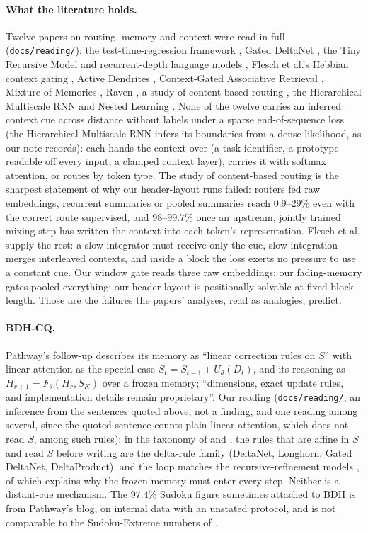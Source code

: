 \documentclass[11pt]{article}
\begin{document}
\paragraph{What the literature holds.} Twelve papers on routing, memory and context were read in full (\texttt{docs/reading/}): the test-time-regression framework \cite{ttr}, Gated DeltaNet \cite{gdn}, the Tiny Recursive Model and recurrent-depth language models \cite{trm, recdepth}, Flesch et al.'s Hebbian context gating \cite{flesch}, Active Dendrites \cite{dendrites}, Context-Gated Associative Retrieval \cite{cgar}, Mixture-of-Memories \cite{mom}, Raven \cite{raven}, a study of content-based routing \cite{routing}, the Hierarchical Multiscale RNN \cite{hmrnn} and Nested Learning \cite{nested}. None of the twelve carries an inferred context cue across distance without labels under a sparse end-of-sequence loss (the Hierarchical Multiscale RNN infers its boundaries from a dense likelihood, as our note records): each hands the context over (a task identifier, a prototype readable off every input, a clamped context layer), carries it with softmax attention, or routes by token type. The study of content-based routing is the sharpest statement of why our header-layout runs failed: routers fed raw embeddings, recurrent summaries or pooled summaries reach $0.9$--$29\%$ even with the correct route supervised, and $98$--$99.7\%$ once an upstream, jointly trained mixing step has written the context into each token's representation. Flesch et al. supply the rest: a slow integrator must receive only the cue, slow integration merges interleaved contexts, and inside a block the loss exerts no pressure to use a constant cue. Our window gate reads three raw embeddings; our fading-memory gates pooled everything; our header layout is positionally solvable at fixed block length. Those are the failures the papers' analyses, read as analogies, predict.

\paragraph{BDH-CQ.} Pathway's follow-up \cite{bdhcq} describes its memory as ``linear correction rules on $S$'' with linear attention as the special case $S_t = S_{t-1} + U_\theta(D_t)$, and its reasoning as $H_{r+1} = F_\theta(H_r, S_K)$ over a frozen memory; ``dimensions, exact update rules, and implementation details remain proprietary''. Our reading (\texttt{docs/reading/}, an inference from the sentences quoted above, not a finding, and one reading among several, since the quoted sentence counts plain linear attention, which does not read $S$, among such rules): in the taxonomy of \cite{ttr} and \cite{nested}, the rules that are affine in $S$ and read $S$ before writing are the delta-rule family (DeltaNet, Longhorn, Gated DeltaNet, DeltaProduct), and the loop matches the recursive-refinement models \cite{trm, recdepth}, of which \cite{recdepth} explains why the frozen memory must enter every step. Neither is a distant-cue mechanism. The $97.4\%$ Sudoku figure sometimes attached to BDH is from Pathway's blog, on internal data with an unstated protocol, and is not comparable to the Sudoku-Extreme numbers of \cite{trm}.
\end{document}
